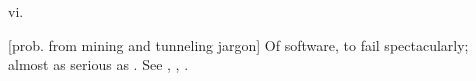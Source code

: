  vi.

[prob. from mining and tunneling jargon] Of software, to fail spectacularly;
almost as serious as . See ,
, .

